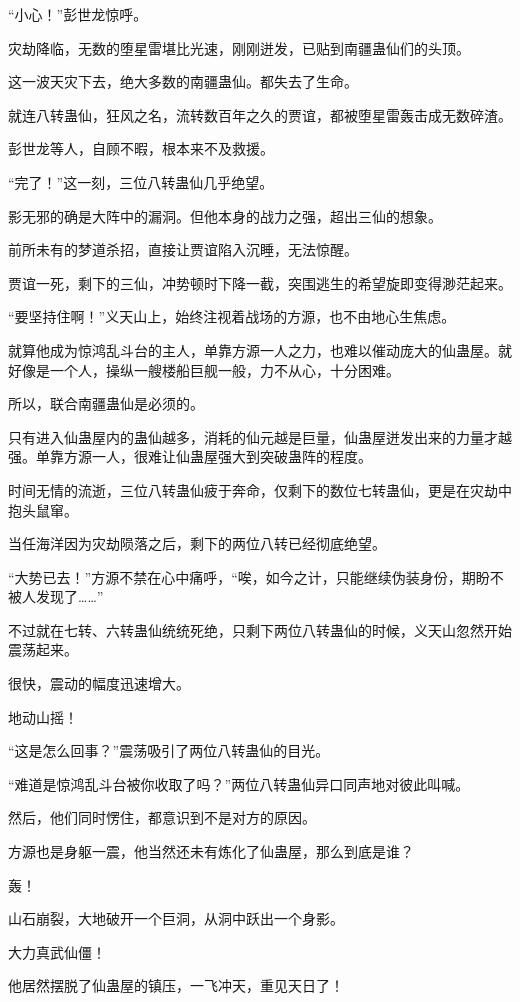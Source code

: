 \begin{this_body}
“小心！”彭世龙惊呼。

灾劫降临，无数的堕星雷堪比光速，刚刚迸发，已贴到南疆蛊仙们的头顶。

这一波天灾下去，绝大多数的南疆蛊仙。都失去了生命。

就连八转蛊仙，狂风之名，流转数百年之久的贾谊，都被堕星雷轰击成无数碎渣。

彭世龙等人，自顾不暇，根本来不及救援。

“完了！”这一刻，三位八转蛊仙几乎绝望。

影无邪的确是大阵中的漏洞。但他本身的战力之强，超出三仙的想象。

前所未有的梦道杀招，直接让贾谊陷入沉睡，无法惊醒。

贾谊一死，剩下的三仙，冲势顿时下降一截，突围逃生的希望旋即变得渺茫起来。

“要坚持住啊！”义天山上，始终注视着战场的方源，也不由地心生焦虑。

就算他成为惊鸿乱斗台的主人，单靠方源一人之力，也难以催动庞大的仙蛊屋。就好像是一个人，操纵一艘楼船巨舰一般，力不从心，十分困难。

所以，联合南疆蛊仙是必须的。

只有进入仙蛊屋内的蛊仙越多，消耗的仙元越是巨量，仙蛊屋迸发出来的力量才越强。单靠方源一人，很难让仙蛊屋强大到突破蛊阵的程度。

时间无情的流逝，三位八转蛊仙疲于奔命，仅剩下的数位七转蛊仙，更是在灾劫中抱头鼠窜。

当任海洋因为灾劫陨落之后，剩下的两位八转已经彻底绝望。

“大势已去！”方源不禁在心中痛呼，“唉，如今之计，只能继续伪装身份，期盼不被人发现了……”

不过就在七转、六转蛊仙统统死绝，只剩下两位八转蛊仙的时候，义天山忽然开始震荡起来。

很快，震动的幅度迅速增大。

地动山摇！

“这是怎么回事？”震荡吸引了两位八转蛊仙的目光。

“难道是惊鸿乱斗台被你收取了吗？”两位八转蛊仙异口同声地对彼此叫喊。

然后，他们同时愣住，都意识到不是对方的原因。

方源也是身躯一震，他当然还未有炼化了仙蛊屋，那么到底是谁？

轰！

山石崩裂，大地破开一个巨洞，从洞中跃出一个身影。

大力真武仙僵！

他居然摆脱了仙蛊屋的镇压，一飞冲天，重见天日了！


\end{this_body}
